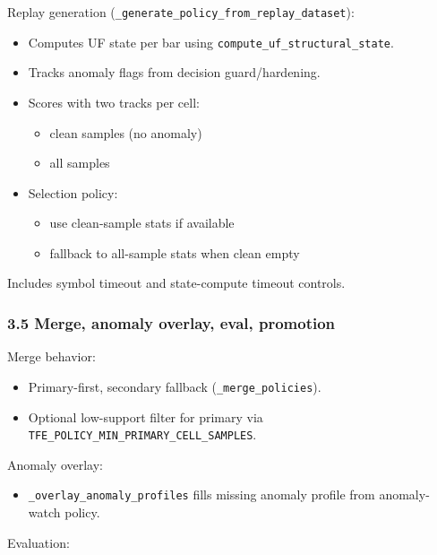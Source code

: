 \documentclass[
]{article}
\providecommand{\tightlist}{%
  \setlength{\itemsep}{0pt}\setlength{\parskip}{0pt}}
\begin{document}
Replay generation (\texttt{\_generate\_policy\_from\_replay\_dataset}):

\begin{itemize}
\tightlist
\item
  Computes UF state per bar using
  \texttt{compute\_uf\_structural\_state}.
\item
  Tracks anomaly flags from decision guard/hardening.
\item
  Scores with two tracks per cell:

  \begin{itemize}
  \tightlist
  \item
    clean samples (no anomaly)
  \item
    all samples
  \end{itemize}
\item
  Selection policy:

  \begin{itemize}
  \tightlist
  \item
    use clean-sample stats if available
  \item
    fallback to all-sample stats when clean empty
  \end{itemize}
\end{itemize}

Includes symbol timeout and state-compute timeout controls.

\subsubsection{3.5 Merge, anomaly overlay, eval,
promotion}\label{35-merge-anomaly-overlay-eval-promotion}

Merge behavior:

\begin{itemize}
\tightlist
\item
  Primary-first, secondary fallback (\texttt{\_merge\_policies}).
\item
  Optional low-support filter for primary via
  \texttt{TFE\_POLICY\_MIN\_PRIMARY\_CELL\_SAMPLES}.
\end{itemize}

Anomaly overlay:

\begin{itemize}
\tightlist
\item
  \texttt{\_overlay\_anomaly\_profiles} fills missing anomaly profile
  from anomaly-watch policy.
\end{itemize}

Evaluation:
\end{document}

